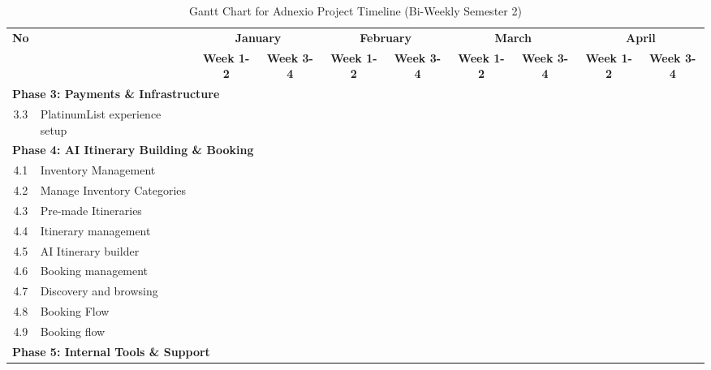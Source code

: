 \begin{table}[htbp]
\centering
\caption{Gantt Chart for Adnexio Project Timeline (Bi-Weekly Semester 2)}
\label{tab:schedule-sem2}
\footnotesize
\setlength{\tabcolsep}{3pt}
\renewcommand{\arraystretch}{1.4}
\begin{adjustbox}{max width=\textwidth}
\begin{tabular}{|c|>{\raggedright\arraybackslash}p{3.2cm}|c|c|c|c|c|c|c|c|}
\hline
\multirow{2}{*}{\textbf{No}} & \multirow{2}{*}{\textbf{Epics}}
  & \multicolumn{2}{c|}{\textbf{January}}
  & \multicolumn{2}{c|}{\textbf{February}}
  & \multicolumn{2}{c|}{\textbf{March}}
  & \multicolumn{2}{c|}{\textbf{April}} \\
\cline{3-10}
 & & \textbf{Week 1-2} & \textbf{Week 3-4} & \textbf{Week 1-2} & \textbf{Week 3-4} & \textbf{Week 1-2} & \textbf{Week 3-4} & \textbf{Week 1-2} & \textbf{Week 3-4} \\
\hline
\multicolumn{10}{|l|}{\cellcolor{phasebg}\textbf{Phase 3: Payments \& Infrastructure}} \\
\hline
3.3 & PlatinumList experience setup & \cellcolor{ganttfill} & & & & & & & \\
\hline
\multicolumn{10}{|l|}{\cellcolor{phasebg}\textbf{Phase 4: AI Itinerary Building \& Booking}} \\
\hline
4.1 & Inventory Management & \cellcolor{ganttfill} & \cellcolor{ganttfill} & & & & & & \\
\hline
4.2 & Manage Inventory Categories & \cellcolor{ganttfill} & \cellcolor{ganttfill} & & & & & & \\
\hline
4.3 & Pre-made Itineraries & & \cellcolor{ganttfill} & \cellcolor{ganttfill} & & & & & \\
\hline
4.4 & Itinerary management & & & \cellcolor{ganttfill} & \cellcolor{ganttfill} & & & & \\
\hline
4.5 & AI Itinerary builder & & & & \cellcolor{ganttfill} & \cellcolor{ganttfill} & & & \\
\hline
4.6 & Booking management & & & & & \cellcolor{ganttfill} & \cellcolor{ganttfill} & & \\
\hline
4.7 & Discovery and browsing & & & & & \cellcolor{ganttfill} & \cellcolor{ganttfill} & & \\
\hline
4.8 & Booking Flow & & & & & & \cellcolor{ganttfill} & \cellcolor{ganttfill} & \\
\hline
4.9 & Booking flow & & & & & & \cellcolor{ganttfill} & \cellcolor{ganttfill} & \\
\hline
\multicolumn{10}{|l|}{\cellcolor{phasebg}\textbf{Phase 5: Internal Tools \& Support}} \\

\end{tabular}
\end{adjustbox}
\end{table}
